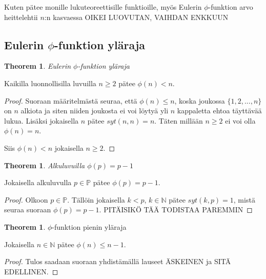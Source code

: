 \documentclass{article}
\theoremstyle{definition}
\newtheorem{theorem}[subsection]{Theorem}
\begin{document}
Kuten pätee monille lukuteoreettisille funktioille, myös Eulerin $\phi$-funktion arvo heittelehtii $n$:n kasvaessa OIKEI LUOVUTAN, VAIHDAN ENKKUUN

\subsection{Eulerin $\phi$-funktion yläraja}

\begin{theorem}{\emph{Eulerin $\phi$-funktion yläraja}}

Kaikilla luonnollisilla luvuilla $n \geq 2$ pätee $\phi(n) < n$.

\begin{proof}

Suoraan määritelmästä seuraa, että $\phi(n) \leq n$, koska joukossa $\{1,2,...,n\}$ on $n$ alkiota ja siten niiden joukosta ei voi löytyä yli $n$ kappaletta ehtoa täyttävää lukua. Lisäksi jokaisella $n$ pätee $syt(n,n) = n$. Täten millään $n \geq 2$ ei voi olla $\phi(n) = n$.

Siis $\phi(n) < n$ jokaisella $n \geq 2$.

\end{proof}

\end{theorem}

\begin{theorem}{\emph{Alkuluvuilla $\phi(p)=p-1$}}

Jokaisella alkuluvulla $p\in\mathbb{P}$ pätee $\phi(p)=p-1$.

\begin{proof}

Olkoon $p\in\mathbb{P}$. Tällöin jokaisella $k<p$, $k\in\mathbb{N}$ pätee $syt(k, p)=1$, mistä seuraa suoraan $\phi(p)=p-1$. PITÄISIKÖ TÄÄ TODISTAA PAREMMIN

\end{proof}

\end{theorem}

\begin{theorem}{$\phi$-funktion pienin yläraja}

Jokaisella $n \in \mathbb{N}$ pätee $\phi(n)\leq {n-1}$.

\begin{proof}

Tulos saadaan suoraan yhdistämällä lauseet ÄSKEINEN ja SITÄ EDELLINEN.

\end{proof}

\end{theorem}
\end{document}

